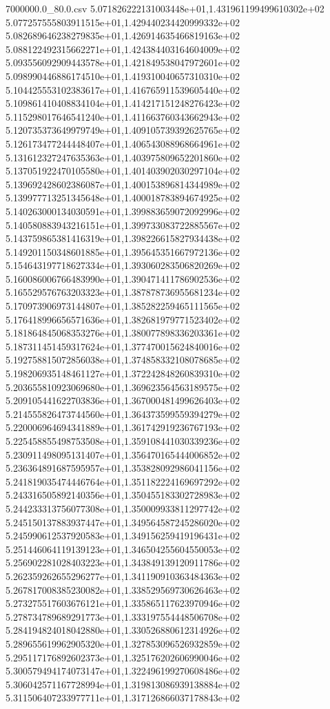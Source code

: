 \begin{filecontents*}{7000000.0_80.0.csv}
5.071826222131003448e+01,1.431961199499610302e+02
5.077257555803911515e+01,1.429440234420999332e+02
5.082689646238279835e+01,1.426914635466819163e+02
5.088122492315662271e+01,1.424384403164604009e+02
5.093556092909443578e+01,1.421849538047972601e+02
5.098990446886174510e+01,1.419310040657310310e+02
5.104425553102383617e+01,1.416765911539605440e+02
5.109861410408834104e+01,1.414217151248276423e+02
5.115298017646541240e+01,1.411663760343662943e+02
5.120735373649979749e+01,1.409105739392625765e+02
5.126173477244448407e+01,1.406543088968664961e+02
5.131612327247635363e+01,1.403975809652201860e+02
5.137051922470105580e+01,1.401403902030297104e+02
5.139692428602386087e+01,1.400153896814344989e+02
5.139977713251345648e+01,1.400018783894674925e+02
5.140263000134030591e+01,1.399883659072092996e+02
5.140580883943216151e+01,1.399733083722885567e+02
5.143759865381416319e+01,1.398226615827934438e+02
5.149201150348601885e+01,1.395645351667972136e+02
5.154643197718627334e+01,1.393060283506820269e+02
5.160086006766483990e+01,1.390471411786902536e+02
5.165529576763203323e+01,1.387878736955681234e+02
5.170973906973144807e+01,1.385282259465111565e+02
5.176418996656571636e+01,1.382681979771523402e+02
5.181864845068353276e+01,1.380077898336203361e+02
5.187311451459317624e+01,1.377470015624840016e+02
5.192758815072856038e+01,1.374858332108078685e+02
5.198206935148461127e+01,1.372242848260839310e+02
5.203655810923069680e+01,1.369623564563189575e+02
5.209105441622703836e+01,1.367000481499626403e+02
5.214555826473744560e+01,1.364373599559394279e+02
5.220006964694341889e+01,1.361742919236767193e+02
5.225458855498753508e+01,1.359108441030339236e+02
5.230911498095131407e+01,1.356470165444006852e+02
5.236364891687595957e+01,1.353828092986041156e+02
5.241819035474446764e+01,1.351182224169697292e+02
5.243316505892140356e+01,1.350455183302728983e+02
5.244233313756077308e+01,1.350009933811297742e+02
5.245150137883937447e+01,1.349564587245286020e+02
5.245990612537920583e+01,1.349156259419196431e+02
5.251446064119139123e+01,1.346504255604550053e+02
5.256902281028403223e+01,1.343849139120911786e+02
5.262359262655296277e+01,1.341190910363484363e+02
5.267817008385230082e+01,1.338529569730626463e+02
5.273275517603676121e+01,1.335865117623970946e+02
5.278734789689291773e+01,1.333197554448506708e+02
5.284194824018042880e+01,1.330526880612314926e+02
5.289655619962905320e+01,1.327853096526932859e+02
5.295117176892602373e+01,1.325176202606990046e+02
5.300579494174073147e+01,1.322496199270608486e+02
5.306042571167728994e+01,1.319813086939138884e+02
5.311506407233977711e+01,1.317126866037178843e+02

\end{filecontents*}
